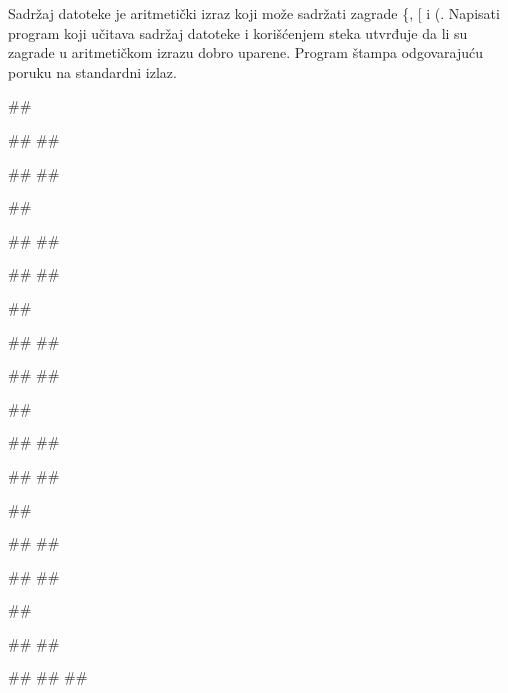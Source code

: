 \begin{Exercise}[label=604]
Sadržaj datoteke je aritmetički izraz koji može sadržati zagrade \{, [ i (. 
Napisati program koji učitava sadržaj datoteke  i korišćenjem steka 
utvrđuje da li su zagrade u aritmetičkom izrazu dobro uparene. Program štampa odgovarajuću poruku na standardni izlaz.

\noindent
\begin{miditest}
\begin{test}{1}
##

##
##
  
#\naslovIzlaz#
##
\end{test}
\end{miditest}
\begin{miditest}
\begin{test}{2}
##

##
##

#\naslovIzlaz#
## 
\end{test}
\end{miditest}
\begin{miditest}
\begin{test}{3}
##

##
#\datoteka{\{[2 + 54) / (24 * 87)\} + (234 + 23)}#

#\naslovIzlaz#
##
\end{test}
\end{miditest}
\begin{miditest}
\begin{test}{3}
##

##
##

#\naslovIzlaz#
##
\end{test}
\end{miditest}
\begin{miditest}
\begin{test}{4}
##

##
##

#\naslovIzlaz#
##
\end{test}
\end{miditest}
\begin{miditest}
\begin{test}{5}
##

##
## 

#\naslovIzlaz#
##
##
\end{test}
\end{miditest}
\end{Exercise}
